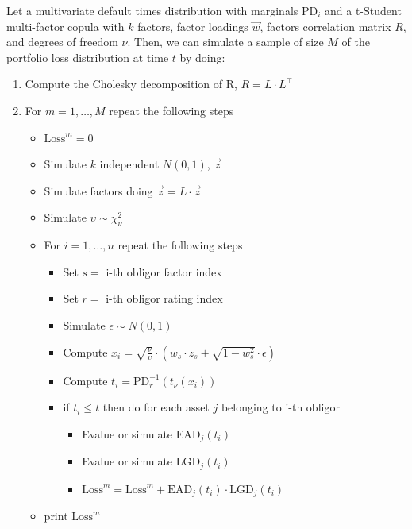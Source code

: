 \documentclass[11pt,fleqn]{book} %
\begin{document}
\begin{algorithm}
	\label{alg:pldmc}
	Let a multivariate default times distribution with marginals $\text{PD}_i$
	and a t-Student multi-factor copula with $k$ factors, factor loadings 
	$\vec{w}$, factors correlation matrix $R$, and degrees of freedom $\nu$.
	Then, we can simulate a sample of size $M$ of the portfolio loss distribution
	at time $t$ by doing:
	\begin{enumerate}
		\item Compute the Cholesky decomposition of R, $R = L \cdot L^\intercal$
		\item For $m=1,\dots,M$ repeat the following steps
		\begin{itemize}
			\item $\text{Loss}^m = 0$
			\item Simulate $k$ independent $N(0,1)$, $\vec{z}$
			\item Simulate factors doing $\vec{z} = L \cdot \vec{z}$
			\item Simulate $\upsilon \sim \chi_{\nu}^2$
			\item For $i=1,\dots,n$ repeat the following steps
			\begin{itemize}
				\item Set $s = $ i-th obligor factor index
				\item Set $r = $ i-th obligor rating index
				\item Simulate $\epsilon \sim N(0,1)$
				\item Compute $x_i = \sqrt{\frac{\nu}{\upsilon}} \cdot \left( w_s \cdot z_s + \sqrt{1-w_s^2} \cdot \epsilon \right)$
				\item Compute $t_i = \text{PD}_r^{-1}\left(t_{\nu}(x_i)\right)$
				\item if $t_i \le t$ then do for each asset $j$ belonging to i-th obligor
				\begin{itemize}
					\item Evalue or simulate $\text{EAD}_j(t_i)$
					\item Evalue or simulate $\text{LGD}_j(t_i)$
					\item $\text{Loss}^m = \text{Loss}^m + \text{EAD}_j(t_i) \cdot \text{LGD}_j(t_i)$
				\end{itemize}
			\end{itemize}
			\item print $\text{Loss}^m$
		\end{itemize}
	\end{enumerate}
\end{algorithm}
\end{document}
